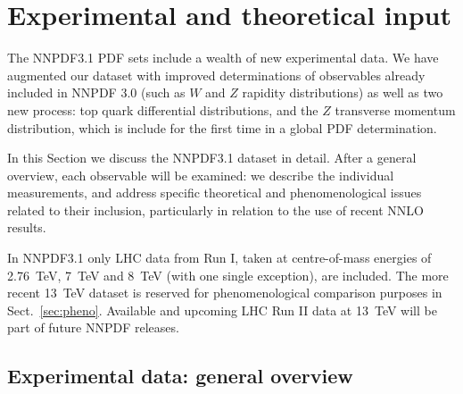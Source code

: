 \section{Experimental and theoretical input}
\label{sec:expdata}

The NNPDF3.1 PDF sets include a wealth of new experimental data.  We
have augmented our dataset with improved determinations of observables
already included in NNPDF 3.0 (such as $W$ and $Z$ rapidity
distributions) as well as two new process: top quark differential
distributions, and the $Z$ transverse momentum distribution, which is
include for the first time in a global PDF determination.

In this Section we discuss the NNPDF3.1 dataset in detail. After a
general overview, each observable 
will be examined: we describe the individual measurements, and 
address specific theoretical and phenomenological issues related to
their inclusion, particularly in relation to the use of recent NNLO results.

In NNPDF3.1 only LHC data from Run I, taken at centre-of-mass
energies of 2.76~TeV, 7~TeV and 8~TeV (with one single exception), are included. The more recent 13~TeV
dataset is reserved for phenomenological comparison purposes in Sect.~\ref{sec:pheno}.
%
Available and upcoming LHC Run II data at 13~TeV will be part of future NNPDF releases.

\subsection{Experimental data: general overview}

